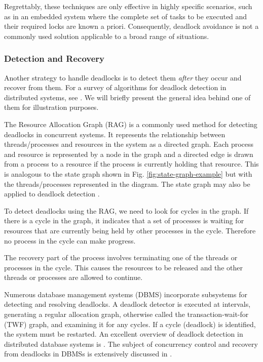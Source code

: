 \documentclass[../Thesis.tex]{subfiles}
\begin{document}
Regrettably, these techniques are only effective in highly specific scenarios,
such as in an embedded system where the complete set of tasks to be executed
and their required locks are known a priori.
Consequently, deadlock avoidance is not a commonly used solution
applicable to a broad range of situations.

\subsubsection{Detection and Recovery}

Another strategy to handle deadlocks is to detect them
\emph{after} they occur and recover from them.
For a survey of algorithms for deadlock detection
in distributed systems, see \cite{singhal1989deadlock}.
We will briefly present the general idea behind one of them for illustration purposes.

The Resource Allocation Graph (RAG) is a commonly used method
for detecting deadlocks in concurrent systems.
It represents the relationship between threads/processes
and resources in the system as a directed graph.
Each process and resource is represented by a node in the graph
and a directed edge is drawn from a process to a resource
if the process is currently holding that resource.
This is analogous to the state graph shown in Fig. \ref{fig:state-graph-example}
but with the threads/processes represented in the diagram.
The state graph may also be applied to deadlock detection \cite{coffman1971deadlocks}.

To detect deadlocks using the RAG, we need to look for cycles in the graph.
If there is a cycle in the graph, it indicates that
a set of processes is waiting for resources
that are currently being held by other processes in the cycle.
Therefore no process in the cycle can make progress.

The recovery part of the process involves
terminating one of the threads or processes in the cycle.
This causes the resources to be released and
the other threads or processes are allowed to continue.

Numerous database management systems (DBMS)
incorporate subsystems for detecting and resolving deadlocks.
A deadlock detector is executed at intervals,
generating a regular allocation graph,
otherwise called the transaction-wait-for (TWF) graph,
and examining it for any cycles.
If a cycle (deadlock) is identified, the system must be restarted.
An excellent overview of deadlock detection
in distributed database systems is \cite{knapp1987deadlock}.
The subject of concurrency control and recovery from deadlocks in DBMSs is
extensively discussed in \cite{bernstein1987concurrency}.
\end{document}
